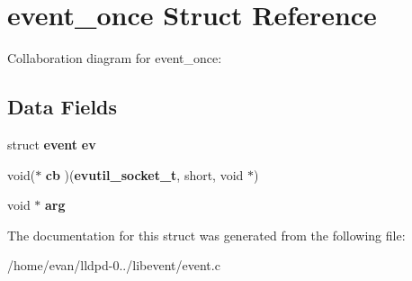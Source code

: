 \section{event\-\_\-once \-Struct \-Reference}
\label{structevent__once}


\-Collaboration diagram for event\-\_\-once\-:
\subsection*{\-Data \-Fields}
\begin{DoxyCompactItemize}
\item 
struct {\bf event} {\bfseries ev}\label{structevent__once_ace3e34472d1f55b6a831df15ff5e2d9c}

\item 
void($\ast$ {\bfseries cb} )({\bf evutil\-\_\-socket\-\_\-t}, short, void $\ast$)\label{structevent__once_a2cb710d0e205e1f8a02c0f05cc7fc542}

\item 
void $\ast$ {\bfseries arg}\label{structevent__once_a9ce2ec4812a92cb6ab39f6e81e9173a9}

\end{DoxyCompactItemize}


\-The documentation for this struct was generated from the following file\-:\begin{DoxyCompactItemize}
\item 
/home/evan/lldpd-\/0../libevent/event.\-c\end{DoxyCompactItemize}
